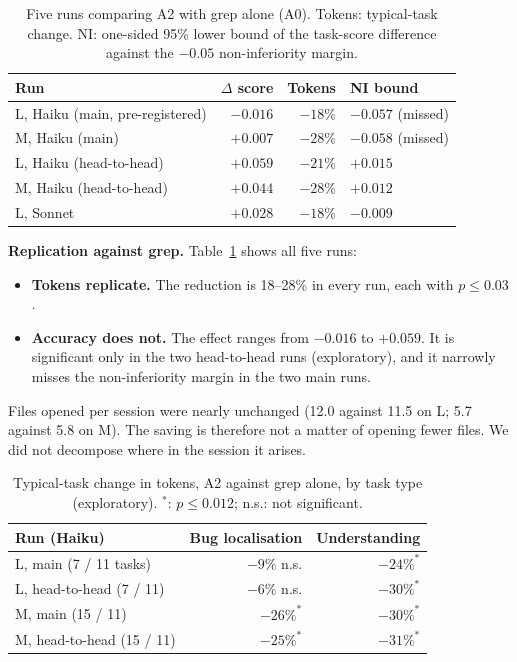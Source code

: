 \documentclass[sigconf,nonacm]{acmart}
\begin{document}
\begin{table}[t]
\caption{Five runs comparing A2 with grep alone (A0). Tokens: typical-task change. NI: one-sided 95\% lower bound of the task-score difference against the $-0.05$ non-inferiority margin.}
\label{tab:replication}
\small
\begin{tabular}{@{}lrrl@{}}
\toprule
Run & $\Delta$ score & Tokens & NI bound \\
\midrule
L, Haiku (main, pre-registered) & $-0.016$ & $-18\%$ & $-0.057$ (missed) \\
M, Haiku (main) & $+0.007$ & $-28\%$ & $-0.058$ (missed) \\
L, Haiku (head-to-head) & $+0.059$ & $-21\%$ & $+0.015$ \\
M, Haiku (head-to-head) & $+0.044$ & $-28\%$ & $+0.012$ \\
L, Sonnet & $+0.028$ & $-18\%$ & $-0.009$ \\
\bottomrule
\end{tabular}
\end{table}

\textbf{Replication against grep.} Table~\ref{tab:replication} shows all five runs:
\begin{itemize}
\item \textbf{Tokens replicate.} The reduction is 18--28\% in every run, each with $p \le 0.03$.
\item \textbf{Accuracy does not.} The effect ranges from $-0.016$ to $+0.059$. It is significant only in the two head-to-head runs (exploratory), and it narrowly misses the non-inferiority margin in the two main runs.
\end{itemize}
Files opened per session were nearly unchanged (12.0 against 11.5 on L; 5.7 against 5.8 on M). The saving is therefore not a matter of opening fewer files. We did not decompose where in the session it arises.

\begin{table}[t]
\caption{Typical-task change in tokens, A2 against grep alone, by task type (exploratory). $^{*}$: $p \le 0.012$; n.s.: not significant.}
\label{tab:bytype}
\small
\begin{tabular}{@{}lrr@{}}
\toprule
Run (Haiku) & Bug localisation & Understanding \\
\midrule
L, main (7 / 11 tasks) & $-9\%$ n.s. & $-24\%^{*}$ \\
L, head-to-head (7 / 11) & $-6\%$ n.s. & $-30\%^{*}$ \\
M, main (15 / 11) & $-26\%^{*}$ & $-30\%^{*}$ \\
M, head-to-head (15 / 11) & $-25\%^{*}$ & $-31\%^{*}$ \\
\bottomrule
\end{tabular}
\end{table}
\end{document}
